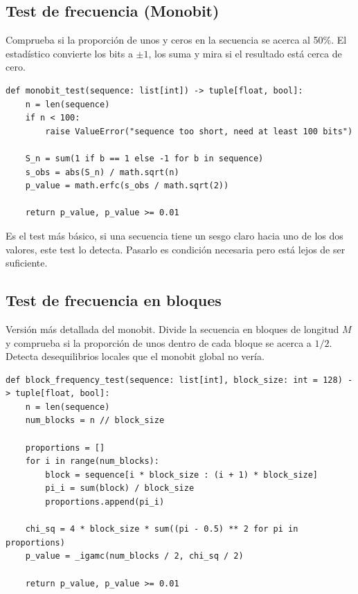 \subsection{Test de frecuencia (Monobit)}

Comprueba si la proporción de unos y ceros en la secuencia se acerca al 50\%.
El estadístico convierte los bits a $\pm 1$, los suma y mira si el resultado está cerca de cero.

\begin{lstlisting}[style=Python,caption={Test Monobit (\texttt{src/tests\_nist/monobit.py}).}]
def monobit_test(sequence: list[int]) -> tuple[float, bool]:
    n = len(sequence)
    if n < 100:
        raise ValueError("sequence too short, need at least 100 bits")

    S_n = sum(1 if b == 1 else -1 for b in sequence)
    s_obs = abs(S_n) / math.sqrt(n)
    p_value = math.erfc(s_obs / math.sqrt(2))

    return p_value, p_value >= 0.01
\end{lstlisting}

Es el test más básico, si una secuencia tiene un sesgo claro hacia uno de los dos valores,
este test lo detecta. Pasarlo es condición necesaria pero está lejos de ser suficiente.

\subsection{Test de frecuencia en bloques}

Versión más detallada del monobit. Divide la secuencia en bloques de longitud $M$ y comprueba si la proporción de unos dentro de cada bloque se acerca a $1/2$.
Detecta desequilibrios locales que el monobit global no vería.

\begin{lstlisting}[style=Python,caption={Test Block Frequency (\texttt{src/tests\_nist/block\_frequency.py}).}]
def block_frequency_test(sequence: list[int], block_size: int = 128) -> tuple[float, bool]:
    n = len(sequence)
    num_blocks = n // block_size

    proportions = []
    for i in range(num_blocks):
        block = sequence[i * block_size : (i + 1) * block_size]
        pi_i = sum(block) / block_size
        proportions.append(pi_i)

    chi_sq = 4 * block_size * sum((pi - 0.5) ** 2 for pi in proportions)
    p_value = _igamc(num_blocks / 2, chi_sq / 2)

    return p_value, p_value >= 0.01
\end{lstlisting}

